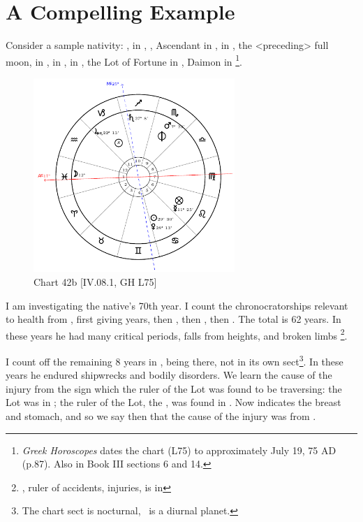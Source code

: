 \section{A Compelling Example}

Consider a sample nativity: \Sun, \Venus\xspace in \Cancer, \Moon, Ascendant in \Pisces, \Saturn\xspace in \Sagittarius,
the <preceding> full moon, \Jupiter\xspace in \Capricorn, \Mars\xspace in \Scorpio, \Mercury\xspace in \Leo, the Lot of Fortune in \Leo, Daimon\xspace in \Scorpio
\footnote{\textit{Greek Horoscopes} dates the chart (L75) to approximately July 19, 75 AD (p.87). Also in Book III sections 6 and 14.}. 

\clearpage
\begin{figure}
\centering
\vspace{-20pt}
\includegraphics[width=0.68\textwidth]{charts/4_08_1}
\caption{Chart 42b [IV.08.1, GH L75]}
\label{fig:chart42b}
\end{figure} 

I am investigating the native’s 70th year. I count the chronocratorships relevant to health from \Leo\xspace <the Lot of Fortune>, first giving \Leo\xspace 19 years, then \Virgo\xspace 20, then \Libra\xspace 8, then \Scorpio\xspace 15. The total is 62 years. In these years he had many critical periods, falls from heights, and broken limbs \footnote{\Mars\xspace, ruler of accidents, injuries, is in \Scorpio}. 

I count off the remaining 8 years in \Sagittarius,\Saturn\xspace being there, not in its own sect\footnote{The chart sect is nocturnal, \Saturn\, is a diurnal planet.}. In these years he endured shipwrecks and bodily disorders. We learn the cause of the injury from the sign which the ruler of the Lot was found to be traversing: the Lot was in \Leo; the ruler of the Lot, the \Sun, was found in \Cancer. Now \Cancer\xspace indicates the breast and stomach, and so we say then that the cause of the injury was from \Cancer. 

